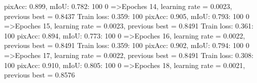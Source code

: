 pixAcc: 0.899, mIoU: 0.782: 100%
  0%
=>Epoches 14, learning rate = 0.0023,                 previous best = 0.8437
Train loss: 0.359: 100%
pixAcc: 0.905, mIoU: 0.793: 100%
  0%
=>Epoches 15, learning rate = 0.0023,                 previous best = 0.8491
Train loss: 0.361: 100%
pixAcc: 0.894, mIoU: 0.773: 100%
  0%
=>Epoches 16, learning rate = 0.0022,                 previous best = 0.8491
Train loss: 0.359: 100%
pixAcc: 0.902, mIoU: 0.794: 100%
  0%
=>Epoches 17, learning rate = 0.0022,                 previous best = 0.8491
Train loss: 0.308: 100%
pixAcc: 0.910, mIoU: 0.805: 100%
  0%
=>Epoches 18, learning rate = 0.0021,                 previous best = 0.8576
